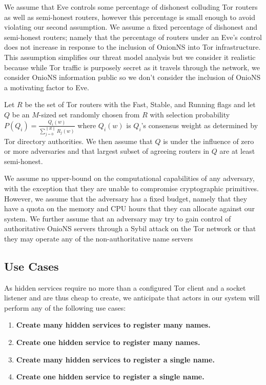 \documentclass[USenglish,oneside,twocolumn]{article}
\begin{document}
We assume that Eve controls some percentage of dishonest colluding Tor routers as well as semi-honest routers, however this percentage is small enough to avoid violating our second assumption. We assume a fixed percentage of dishonest and semi-honest routers; namely that the percentage of routers under an Eve's control does not increase in response to the inclusion of OnionNS into Tor infrastructure. This assumption simplifies our threat model analysis but we consider it realistic because while Tor traffic is purposely secret as it travels through the network, we consider OnioNS information public so we don't consider the inclusion of OnioNS a motivating factor to Eve.

Let $ R $ be the set of Tor routers with the Fast, Stable, and Running flags and let $ Q $ be an $ M $-sized set randomly chosen from $ R $ with selection probability $ P (Q_{i}) = \frac{Q_{i}(w)}{\sum_{j=0}^{\| R \|} R_{j}(w)} $ where $ Q_{i}(w) $ is $ Q_{i} $'s consensus weight as determined by Tor directory authorities. We then assume that $ Q $ is under the influence of zero or more adversaries and that largest subset of agreeing routers in $ Q $ are at least semi-honest.

We assume no upper-bound on the computational capabilities of any adversary, with the exception that they are unable to compromise cryptographic primitives. However, we assume that the adversary has a fixed budget, namely that they have a quota on the memory and CPU hours that they can allocate against our system. We further assume that an adversary may try to gain control of authoritative OnioNS servers through a Sybil attack on the Tor network or that they may operate any of the non-authoritative name servers

\subsection{Use Cases}
\label{sec:useCases}

As hidden services require no more than a configured Tor client and a socket listener and are thus cheap to create, we anticipate that actors in our system will perform any of the following use cases:

\begin{enumerate}
	\item \textbf{Create many hidden services to register many names.}
	\item \textbf{Create one hidden service to register many names.}
	\item \textbf{Create many hidden services to register a single name.}
	\item \textbf{Create one hidden service to register a single name.}
\end{enumerate}
\end{document}
